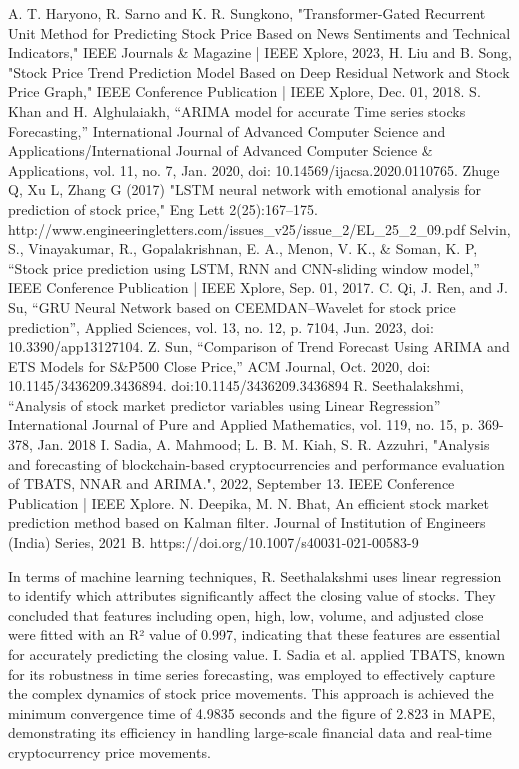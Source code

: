 \documentclass[conference]{IEEEtran}
\begin{document}
\newpage

A. T. Haryono, R. Sarno and K. R. Sungkono, "Transformer-Gated Recurrent Unit Method for Predicting Stock Price Based on News Sentiments and Technical Indicators," IEEE Journals \& Magazine | IEEE Xplore, 2023,
H. Liu and B. Song, "Stock Price Trend Prediction Model Based on Deep Residual Network and Stock Price Graph," IEEE Conference Publication | IEEE Xplore, Dec. 01, 2018.
S. Khan and H. Alghulaiakh, “ARIMA model for accurate Time series stocks Forecasting,” International Journal of Advanced Computer Science and Applications/International Journal of Advanced Computer Science \& Applications, vol. 11, no. 7, Jan. 2020, doi: 10.14569/ijacsa.2020.0110765.
Zhuge Q, Xu L, Zhang G (2017) "LSTM neural network with emotional analysis for prediction of stock price," Eng Lett 2(25):167–175. http://www.engineeringletters.com/issues\_v25/issue\_2/EL\_25\_2\_09.pdf
Selvin, S., Vinayakumar, R., Gopalakrishnan, E. A., Menon, V. K., \& Soman, K. P, “Stock price prediction using LSTM, RNN and CNN-sliding window model,” IEEE Conference Publication | IEEE Xplore, Sep. 01, 2017.
C. Qi, J. Ren, and J. Su, “GRU Neural Network based on CEEMDAN–Wavelet for stock price prediction”, Applied Sciences, vol. 13, no. 12, p. 7104, Jun. 2023, doi: 10.3390/app13127104.
Z. Sun, “Comparison of Trend Forecast Using ARIMA and ETS Models for S\&P500 Close Price,” ACM Journal, Oct. 2020, doi: 10.1145/3436209.3436894.
doi:10.1145/3436209.3436894
R. Seethalakshmi, “Analysis of stock market predictor variables using Linear Regression” International Journal of Pure and Applied Mathematics, vol. 119, no. 15, p. 369-378, Jan. 2018
 I. Sadia, A. Mahmood; L. B. M. Kiah, S. R. Azzuhri, "Analysis and forecasting of blockchain-based cryptocurrencies and performance evaluation of TBATS, NNAR and ARIMA.", 2022, September 13. IEEE Conference Publication | IEEE Xplore.
 N. Deepika, M. N. Bhat,  An efficient stock market prediction method based on Kalman filter. Journal of Institution of Engineers (India) Series, 2021 B. https://doi.org/10.1007/s40031-021-00583-9


In terms of machine learning techniques, R. Seethalakshmi \cite{b8} uses linear regression to identify which attributes significantly affect the closing value of stocks. They concluded that features including open, high, low, volume, and adjusted close were fitted with an R² value of 0.997, indicating that these features are essential for accurately predicting the closing value. I. Sadia et al. \cite{b9} applied TBATS, known for its robustness in time series forecasting, was employed to effectively capture the complex dynamics of stock price movements. This approach is achieved the minimum convergence time of 4.9835 seconds and the figure of 2.823 in MAPE, demonstrating its efficiency in handling large-scale financial data and real-time cryptocurrency price movements.
\end{document}
